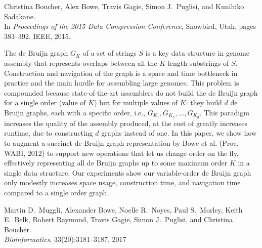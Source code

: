 {Christina Boucher, Alex Bowe, Travis Gagie, Simon J.~Puglisi, and Kunihiko Sadakane.\\
In \textit{Proceedings of the 2015 Data Compression Conference}, Snowbird, Utah, pages 383--392. IEEE, 2015.}

\noindent
The de Bruijn graph $G_K$ of a set of strings $S$ is a key data structure in 
genome assembly that represents overlaps between all the $K$-length substrings 
of $S$. Construction and navigation of the graph is a space and time bottleneck 
in practice and the main hurdle for assembling large genomes. 
This problem is compounded because state-of-the-art assemblers do not build the de Bruijn graph for a single order (value of $K$) but for multiple values of $K$: they build $d$ de Bruijn graphs, each with a specific order, i.e., $G_{K_1}, G_{K_2}, \ldots, G_{K_d}$.  
This paradigm increases the quality of the assembly produced, at the cost of greatly increases runtime, due to constructing $d$ graphs instead of one.
In this paper, we show how to augment a succinct de Bruijn graph 
representation by Bowe et al. (Proc. WABI, 2012) 
to support new operations that let us change order on the fly, effectively
representing all de Bruijn graphs up to some maximum order $K$ in
a single data structure. 
Our experiments show our variable-order de Bruijn graph only modestly increases
space usage, construction time, and navigation time compared to a single order graph.


{Martin D.~Muggli, Alexander Bowe, Noelle R.~Noyes, Paul S.~Morley, Keith E.~Belk, Robert Raymond, Travis Gagie, Simon J.~Puglisi, and Christina Boucher.\\
\textit{Bioinformatics}, 33(20):3181--3187, 2017}

